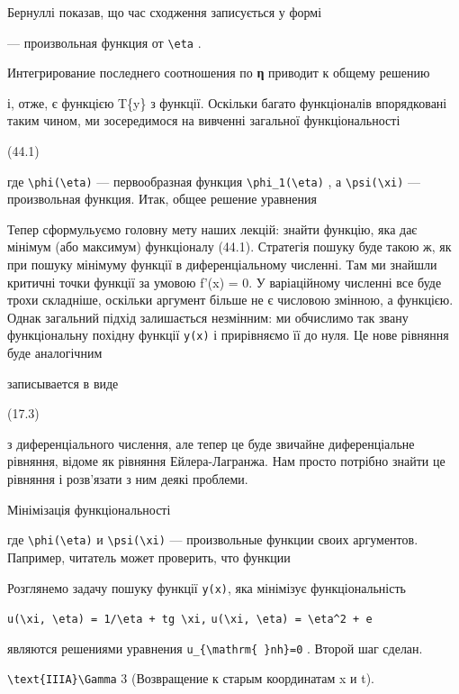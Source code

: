 \documentclass[
  ukrainian,
]{article}
\begin{document}
Бернуллі показав, що час сходження записується у формі

--- произвольная функция от \texttt{\textbackslash{}eta} .

Интегрирование последнего соотношения по \textbf{η} приводит к общему
решению

і, отже, є функцією T\{y\} з функції. Оскільки багато функціоналів
впорядковані таким чином, ми зосередимося на вивченні загальної
функціональності

(44.1)

где \texttt{\textbackslash{}phi(\textbackslash{}eta)} --- первообразная
функция \texttt{\textbackslash{}phi\_1(\textbackslash{}eta)} , а
\texttt{\textbackslash{}psi(\textbackslash{}xi)} --- произвольная
функция. Итак, общее решение уравнения

Тепер сформульуємо головну мету наших лекцій: знайти функцію, яка дає
мінімум (або максимум) функціоналу (44.1). Стратегія пошуку буде такою
ж, як при пошуку мінімуму функції в диференціальному численні. Там ми
знайшли критичні точки функції за умовою f'(x) = 0. У варіаційному
численні все буде трохи складніше, оскільки аргумент більше не є
числовою змінною, а функцією. Однак загальний підхід залишається
незмінним: ми обчислимо так звану функціональну похідну функції
\texttt{y(x)} і прирівняємо її до нуля. Це нове рівняння буде
аналогічним

записывается в виде

(17.3)

з диференціального числення, але тепер це буде звичайне диференціальне
рівняння, відоме як рівняння Ейлера-Лагранжа. Нам просто потрібно знайти
це рівняння і розв'язати з ним деякі проблеми.

Мінімізація функціональності

где \texttt{\textbackslash{}phi(\textbackslash{}eta)} и
\texttt{\textbackslash{}psi(\textbackslash{}xi)} --- произвольные
функции своих аргументов. Папример, читатель может проверить, что
функции

Розглянемо задачу пошуку функції \texttt{y(x)}, яка мінімізує
функціональність

\texttt{u(\textbackslash{}xi,\ \textbackslash{}eta)\ =\ 1/\textbackslash{}eta\ +\ tg\ \textbackslash{}xi,}
\texttt{u(\textbackslash{}xi,\ \textbackslash{}eta)\ =\ \textbackslash{}eta\^{}2\ +\ e}

являются решениями уравнения
\texttt{u\_\{\textbackslash{}mathrm\{\ \}nh\}=0} . Второй шаг сделан.

\texttt{\textbackslash{}text\{IIIA\}\textbackslash{}Gamma} 3
(Возвращение к старым координатам x и t).
\end{document}
